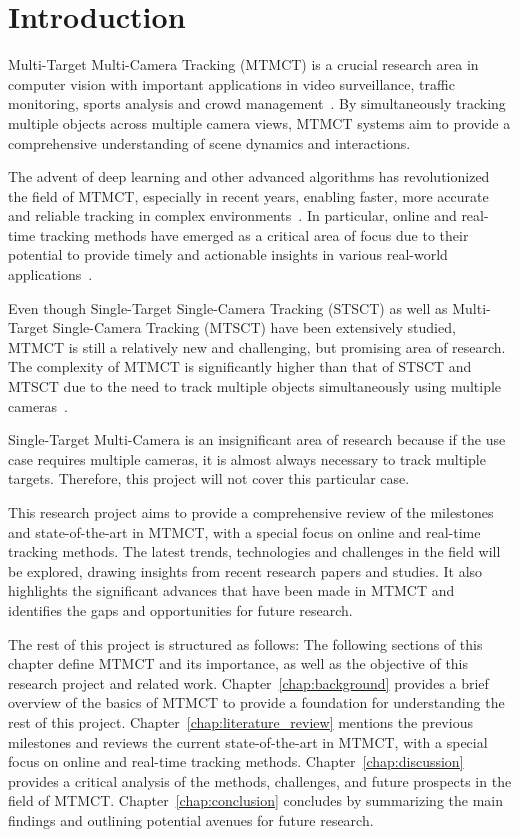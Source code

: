 \chapter{Introduction}\label{chap:introduction}
Multi-Target Multi-Camera Tracking (MTMCT) is a crucial research area in computer vision with important applications in video surveillance, traffic monitoring, sports analysis and crowd management~\cite{Tang19,Naphade23,Komorowski22,Dendorfer20}. By simultaneously tracking multiple objects across multiple camera views, MTMCT systems aim to provide a comprehensive understanding of scene dynamics and interactions.

The advent of deep learning and other advanced algorithms has revolutionized the field of MTMCT, especially in recent years, enabling faster, more accurate and reliable tracking in complex environments~\cite{Zadeh21}. In particular, online and real-time tracking methods have emerged as a critical area of focus due to their potential to provide timely and actionable insights in various real-world applications~\cite{Chen22,Wang21,Tesfaye19}.

Even though Single-Target Single-Camera Tracking (STSCT) as well as Multi-Target Single-Camera Tracking (MTSCT) have been extensively studied, MTMCT is still a relatively new and challenging, but promising area of research. The complexity of MTMCT is significantly higher than that of STSCT and MTSCT due to the need to track multiple objects simultaneously using multiple cameras~\cite{Amosa23}.

Single-Target Multi-Camera is an insignificant area of research because if the use case requires multiple cameras, it is almost always necessary to track multiple targets. Therefore, this project will not cover this particular case.

This research project aims to provide a comprehensive review of the milestones and state-of-the-art in MTMCT, with a special focus on online and real-time tracking methods. The latest trends, technologies and challenges in the field will be explored, drawing insights from recent research papers and studies. It also highlights the significant advances that have been made in MTMCT and identifies the gaps and opportunities for future research.

The rest of this project is structured as follows: The following sections of this chapter define MTMCT and its importance, as well as the objective of this research project and related work. Chapter~\ref{chap:background} provides a brief overview of the basics of MTMCT to provide a foundation for understanding the rest of this project. Chapter~\ref{chap:literature_review} mentions the previous milestones and reviews the current state-of-the-art in MTMCT, with a special focus on online and real-time tracking methods. Chapter~\ref{chap:discussion} provides a critical analysis of the methods, challenges, and future prospects in the field of MTMCT. Chapter~\ref{chap:conclusion} concludes by summarizing the main findings and outlining potential avenues for future research.

